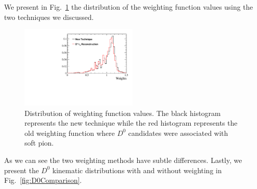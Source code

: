 \documentclass{article}
\begin{document}
        We present  in Fig.~\ref{fig:weightsBeforeAfter} the distribution of the weighting function values using the two techniques we discussed.
        \begin{figure}[h!]
                \centering
                \includegraphics[width = 0.5\textwidth]{../work/RapidSimAnalysis/NewWeightingFunction/Plots/WeighsBeforeAfter.pdf}
                \caption{Distribution of weighting function values.
                The black histogram represents the new technique while the red histogram represents the old weighting function where $D^0$ candidates were associated with soft pion.}
                \label{fig:weightsBeforeAfter}
        \end{figure}
        As we can see the two weighting methods have subtle differences.
        Lastly, we present the $D^0$ kinematic distributions with and without weighting in Fig.~\ref{fig:D0Comparison}.
\end{document}

